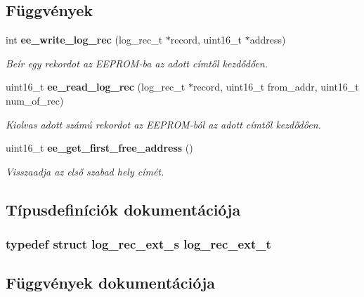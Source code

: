 \subsection*{Függvények}
\begin{DoxyCompactItemize}
\item 
int {\bf ee\-\_\-write\-\_\-log\-\_\-rec} (log\-\_\-rec\-\_\-t $\ast$record, uint16\-\_\-t $\ast$address)
\begin{DoxyCompactList}\small\item\em Beír egy rekordot az E\-E\-P\-R\-O\-M-\/ba az adott címtől kezdődően. \end{DoxyCompactList}\item 
uint16\-\_\-t {\bf ee\-\_\-read\-\_\-log\-\_\-rec} (log\-\_\-rec\-\_\-t $\ast$record, uint16\-\_\-t from\-\_\-addr, uint16\-\_\-t num\-\_\-of\-\_\-rec)
\begin{DoxyCompactList}\small\item\em Kiolvas adott számú rekordot az E\-E\-P\-R\-O\-M-\/ból az adott címtől kezdődően. \end{DoxyCompactList}\item 
uint16\-\_\-t {\bf ee\-\_\-get\-\_\-first\-\_\-free\-\_\-address} ()
\begin{DoxyCompactList}\small\item\em Visszaadja az első szabad hely címét. \end{DoxyCompactList}\end{DoxyCompactItemize}


\subsection{Típusdefiníciók dokumentációja}
\subsubsection[{log\-\_\-rec\-\_\-ext\-\_\-t}]{\setlength{\rightskip}{0pt plus 5cm}typedef struct {\bf log\-\_\-rec\-\_\-ext\-\_\-s}  {\bf log\-\_\-rec\-\_\-ext\-\_\-t}}\label{eeprom_8c_a87e61d040028e5a92f9169b2dc301095}


\subsection{Függvények dokumentációja}
